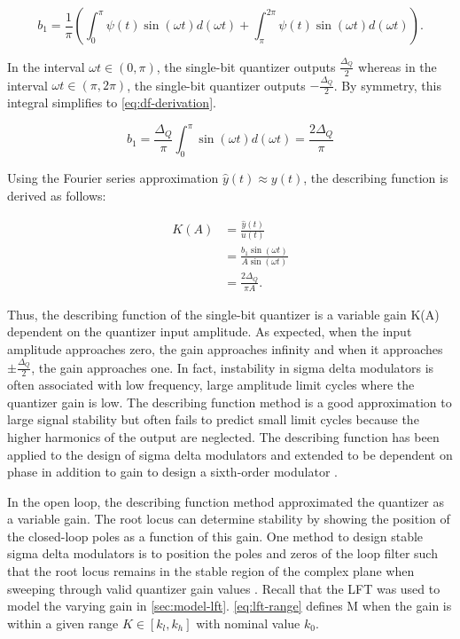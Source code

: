 \begin{equation*}
	b_1 = \frac{1}{\pi}\left(\int_0^\pi\psi(t)\sin(\omega t)d(\omega t) + \int_\pi^{2\pi}\psi(t)\sin(\omega t)d(\omega t)\right).
\end{equation*}

In the interval $\omega t \in (0, \pi)$, the single-bit quantizer outputs $\frac{\Delta_Q}{2}$ whereas in the interval $\omega t \in (\pi, 2\pi)$, the single-bit quantizer outputs $-\frac{\Delta_Q}{2}$. By symmetry, this integral simplifies to \autoref{eq:df-derivation}.

\begin{equation}
	b_1 = \frac{\Delta_Q}{\pi}\int_0^\pi \sin(\omega t)d(\omega t) = \frac{2\Delta_Q}{\pi} \label{eq:df-derivation}
\end{equation}

Using the Fourier series approximation $\hat{y}(t) \approx y(t)$, the describing function is derived as follows:

\begin{align*}
	K(A) &= \frac{\hat{y}(t)}{u(t)} \\
	&= \frac{b_1\sin(\omega t)}{A\sin(\omega t)} \\
	&= \frac{2\Delta_Q}{\pi A}.
\end{align*}

Thus, the describing function of the single-bit quantizer is a variable gain \gls{K(A)} dependent on the quantizer input amplitude. As expected, when the input amplitude approaches zero, the gain approaches infinity and when it approaches $\pm\frac{\Delta_Q}{2}$, the gain approaches one. In fact, instability in sigma delta modulators is often associated with low frequency, large amplitude limit cycles where the quantizer gain is low. The describing function method is a good approximation to large signal stability but often fails to predict small limit cycles because the higher harmonics of the output are neglected. The describing function has been applied to the design of sigma delta modulators \cite{Engelen1999} and extended to be dependent on phase in addition to gain to design a sixth-order modulator \cite{VanEngelen1999a}.

In the open loop, the describing function method approximated the quantizer as a variable gain. The root locus can determine stability by showing the position of the closed-loop poles as a function of this gain. One method to design stable sigma delta modulators is to position the poles and zeros of the loop filter such that the root locus remains in the stable region of the complex plane when sweeping through valid quantizer gain values \cite{Yang2002, Kuo2006, Kang2014}. Recall that the \gls{LFT} was used to model the varying gain in \autoref{sec:model-lft}. \autoref{eq:lft-range} defines \gls{M} when the gain is within a given range $K \in [k_l, k_h]$ with nominal value $k_0$.

